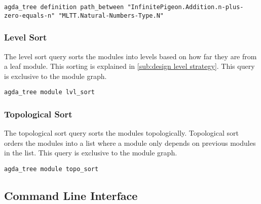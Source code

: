 \begin{lstlisting}
agda_tree definition path_between "InfinitePigeon.Addition.n-plus-zero-equals-n" "MLTT.Natural-Numbers-Type.N"
\end{lstlisting}

\subsubsection{Level Sort}

The level sort query sorts the modules into levels based on how far they are
from a leaf module. This sorting is explained in \cref{sub:design level
strategy}. This query is exclusive to the module graph. 

\begin{lstlisting}
agda_tree module lvl_sort
\end{lstlisting}

\subsubsection{Topological Sort}

The topological sort query sorts the modules topologically. Topological sort
orders the modules into a list where a module only depends on previous modules
in the list. This query is exclusive to the module graph. 

\begin{lstlisting}
agda_tree module topo_sort
\end{lstlisting}


\subsection{Command Line Interface}\label{sub:Agda Tree CLI}

